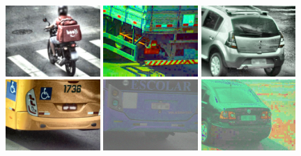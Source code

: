 \documentclass[12pt,oneside]{memoir}
\begin{document}
\begin{figure}[!htbp]
\centering
  \includegraphics[width=0.32\textwidth]{matfmaster/glava4/basic_aug/1.jpg}
  \includegraphics[width=0.32\textwidth]{matfmaster/glava4/basic_aug/2.jpg}
  \includegraphics[width=0.32\textwidth]{matfmaster/glava4/basic_aug/3.jpg}
  \includegraphics[width=0.32\textwidth]{matfmaster/glava4/basic_aug/4.jpg}  \includegraphics[width=0.32\textwidth]{matfmaster/glava4/basic_aug/5.jpg}
  \includegraphics[width=0.32\textwidth]{matfmaster/glava4/basic_aug/6.jpg}

\end{figure}
\end{document}
